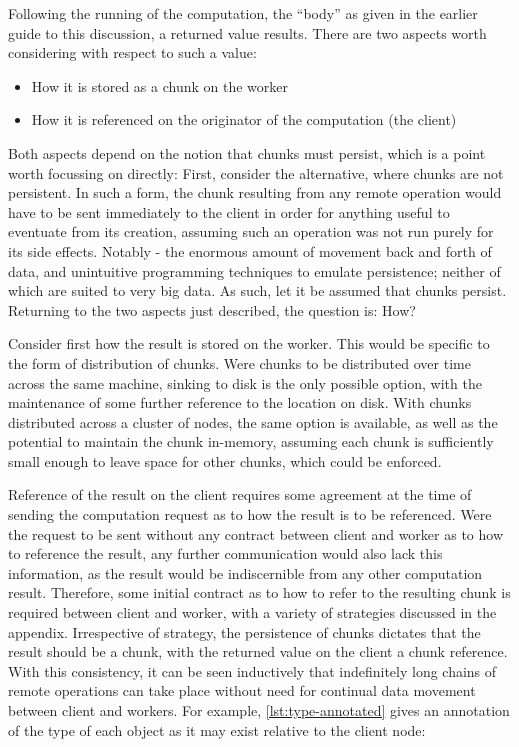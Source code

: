Following the running of the computation, the ``body'' as given in the earlier guide to this discussion, a returned value results.
There are two aspects worth considering with respect to such a value:

\begin{itemize} \item How it is stored as a chunk on the worker \item How it is referenced on the originator of the computation (the client) \end{itemize}

Both aspects depend on the notion that chunks must persist, which is a point worth focussing on directly: First, consider the alternative, where chunks are not persistent.
In such a form, the chunk resulting from any remote operation would have to be sent immediately to the client in order for anything useful to eventuate from its creation, assuming such an operation was not run purely for its side effects.
Notably - the enormous amount of movement back and forth of data, and unintuitive programming techniques to emulate persistence; neither of which are suited to very big data.
As such, let it be assumed that chunks persist.
Returning to the two aspects just described, the question is: How?

Consider first how the result is stored on the worker.
This would be specific to the form of distribution of chunks.
Were chunks to be distributed over time across the same machine, sinking to disk is the only possible option, with the maintenance of some further reference to the location on disk.
With chunks distributed across a cluster of nodes, the same option is available, as well as the potential to maintain the chunk in-memory, assuming each chunk is sufficiently small enough to leave space for other chunks, which could be enforced.

Reference of the result on the client requires some agreement at the time of sending the computation request as to how the result is to be referenced.
Were the request to be sent without any contract between client and worker as to how to reference the result, any further communication would also lack this information, as the result would be indiscernible from any other computation result.
Therefore, some initial contract as to how to refer to the resulting chunk is required between client and worker, with a variety of strategies discussed in the appendix.
Irrespective of strategy, the persistence of chunks dictates that the result should be a chunk, with the returned value on the client a chunk reference.
With this consistency, it can be seen inductively that indefinitely long chains of remote operations can take place without need for continual data movement between client and workers.
For example, \cref{lst:type-annotated} gives an annotation of the type of each object as it may exist relative to the client node:

